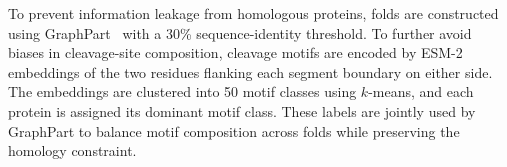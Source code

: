 \documentclass{article}
\begin{document}
To prevent information leakage from homologous proteins, folds are constructed using GraphPart~\citep{graphpart2023} with a 30\% sequence-identity threshold. To further avoid biases in cleavage-site composition, cleavage motifs are encoded by ESM-2 embeddings of the two residues flanking each segment boundary on either side. The embeddings are clustered into 50 motif classes using $k$-means, and each protein is assigned its dominant motif class. These labels are jointly used by GraphPart to balance motif composition across folds while preserving the homology constraint.



\end{document}
